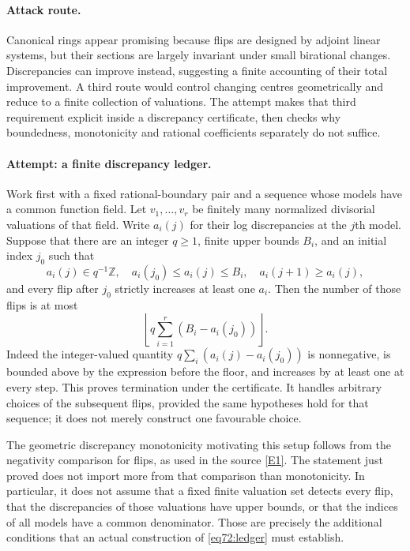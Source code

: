 \documentclass[11pt,a4paper]{article}
\numberwithin{equation}{section}
\newcommand{\Z}{\mathbb{Z}}
\newcommand{\eref}[2]{\hyperlink{extra:#1:#2}{[E#2]}}
\begin{document}
\paragraph{Attack route.}
Canonical rings appear promising because flips are designed by adjoint
linear systems, but their sections are largely invariant under small
birational changes. Discrepancies can improve instead, suggesting a finite
accounting of their total improvement. A third route would control changing
centres geometrically and reduce to a finite collection of valuations.
The attempt makes that third requirement explicit inside a discrepancy
certificate, then checks why boundedness, monotonicity and rational
coefficients separately do not suffice.

\paragraph{Attempt: a finite discrepancy ledger.}
Work first with a fixed rational-boundary pair and a sequence whose models
have a common function field. Let $v_1,\ldots,v_r$ be finitely many
normalized divisorial valuations of that field. Write $a_i(j)$ for their
log discrepancies at the $j$th model. Suppose that there are an integer
$q\geq1$, finite upper bounds $B_i$, and an initial index $j_0$ such that
\begin{equation}\label{eq72:ledger}
 a_i(j)\in q^{-1}\Z,\quad
 a_i(j_0)\leq a_i(j)\leq B_i,\quad
 a_i(j+1)\geq a_i(j),
\end{equation}
and every flip after $j_0$ strictly increases at least one $a_i$.
Then the number of those flips is at most
\begin{equation}\label{eq72:bound}
 \left\lfloor q\sum_{i=1}^r(B_i-a_i(j_0))\right\rfloor.
\end{equation}
Indeed the integer-valued quantity
$q\sum_i(a_i(j)-a_i(j_0))$ is nonnegative, is bounded above by the
expression before the floor, and increases by at least one at every step.
This proves termination under the certificate. It handles arbitrary choices
of the subsequent flips, provided the same hypotheses hold for that
sequence; it does not merely construct one favourable choice.

The geometric discrepancy monotonicity motivating this setup follows from
the negativity comparison for flips, as used in the source
\eref{72}{1}. The statement just proved does not import more from that
comparison than monotonicity. In particular, it does not assume that a
fixed finite valuation set detects every flip, that the discrepancies of
those valuations have upper bounds, or that the indices of all models
have a common denominator. Those are precisely the additional conditions
that an actual construction of \eqref{eq72:ledger} must establish.
\end{document}
